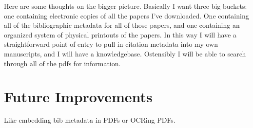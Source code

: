 \documentclass[letterpaper,12pt]{article}
\begin{document}
Here are some thoughts on the bigger picture. Basically I want three big buckets: one containing electronic copies of all the papers I've downloaded. One containing all of the bibliographic metadata for all of those papers, and one containing an organized system of physical printouts of the papers. In this way I will have a straightforward point of entry to pull in citation metadata into my own manuscripts, and I will have a knowledgebase. Ostensibly I will be able to search through all of the pdfs for information.






\section{Future Improvements}
Like embedding bib metadata in PDFs or OCRing PDFs.
\end{document}
